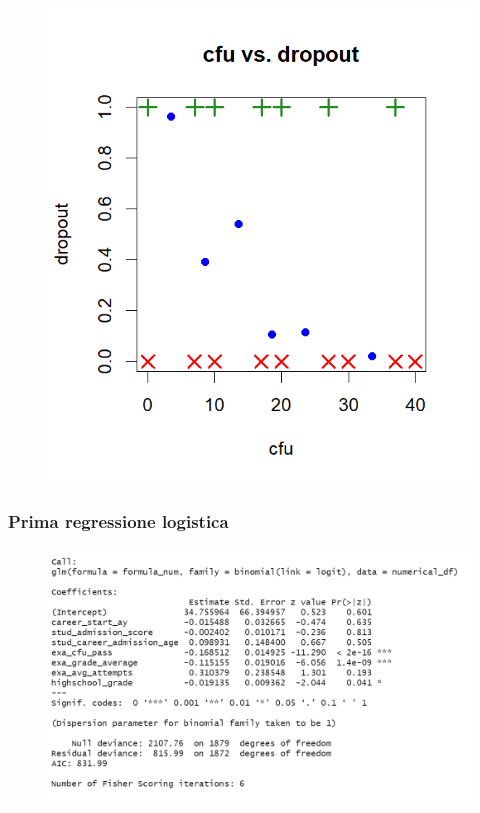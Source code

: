 \documentclass{beamer}
\begin{document}
\begin{frame}
\frametitle{}
\begin{figure}[h]
    \centering
    \includegraphics[width=.75\textwidth]{Rplot01.png} %
    \label{}
\end{figure}
\end{frame}
\begin{frame}
\frametitle{Prima regressione logistica}
\begin{figure}[h]
    \centering
    \includegraphics[width=1.1\textwidth]{Screenshot 2024-05-26 115620.png} %
    \label{Prima regressione con tutte le covariate numeriche}
\end{figure}
\end{frame}
\end{document}
